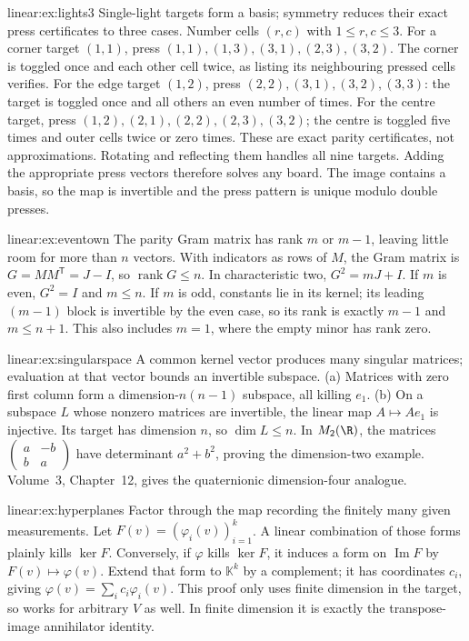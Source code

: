 \begin{solution}{linear:ex:lights3}
\idea Single-light targets form a basis; symmetry reduces their exact press certificates to three cases.
\writeup Number cells $(r,c)$ with $1\le r,c\le3$. For a corner target $(1,1)$, press $(1,1),(1,3),(3,1),(2,3),(3,2)$. The corner is toggled once and each other cell twice, as listing its neighbouring pressed cells verifies. For the edge target $(1,2)$, press $(2,2),(3,1),(3,2),(3,3)$: the target is toggled once and all others an even number of times. For the centre target, press $(1,2),(2,1),(2,2),(2,3),(3,2)$; the centre is toggled five times and outer cells twice or zero times. These are exact parity certificates, not approximations. Rotating and reflecting them handles all nine targets. Adding the appropriate press vectors therefore solves any board. The image contains a basis, so the map is invertible and the press pattern is unique modulo double presses.
\end{solution}
\begin{solution}{linear:ex:eventown}
\idea The parity Gram matrix has rank $m$ or $m-1$, leaving little room for more than $n$ vectors.
\writeup With indicators as rows of $M$, the Gram matrix is $G=MM^{\mathsf T}=J-I$, so $\operatorname{rank}G\le n$. In characteristic two, $G^2=mJ+I$. If $m$ is even, $G^2=I$ and $m\le n$. If $m$ is odd, constants lie in its kernel; its leading $(m-1)$ block is invertible by the even case, so its rank is exactly $m-1$ and $m\le n+1$. This also includes $m=1$, where the empty minor has rank zero.
\end{solution}
\begin{solution}{linear:ex:singularspace}
\idea A common kernel vector produces many singular matrices; evaluation at that vector bounds an invertible subspace.
\writeup (a) Matrices with zero first column form a dimension-$n(n-1)$ subspace, all killing $e_1$. (b) On a subspace $L$ whose nonzero matrices are invertible, the linear map $A\mapsto Ae_1$ is injective. Its target has dimension $n$, so $\dim L\le n$. In $M_2(\R)$, the matrices $\begin{pmatrix}a&-b\\b&a\end{pmatrix}$ have determinant $a^2+b^2$, proving the dimension-two example. Volume~3, Chapter~12, gives the quaternionic dimension-four analogue.
\end{solution}
\begin{solution}{linear:ex:hyperplanes}
\idea Factor through the map recording the finitely many given measurements.
\writeup Let $F(v)=(\varphi_i(v))_{i=1}^k$. A linear combination of those forms plainly kills $\ker F$. Conversely, if $\varphi$ kills $\ker F$, it induces a form on $\operatorname{Im}F$ by $F(v)\mapsto\varphi(v)$. Extend that form to $\mathbb K^k$ by a complement; it has coordinates $c_i$, giving $\varphi(v)=\sum_ic_i\varphi_i(v)$. This proof only uses finite dimension in the target, so works for arbitrary $V$ as well. In finite dimension it is exactly the transpose-image annihilator identity.
\end{solution}
